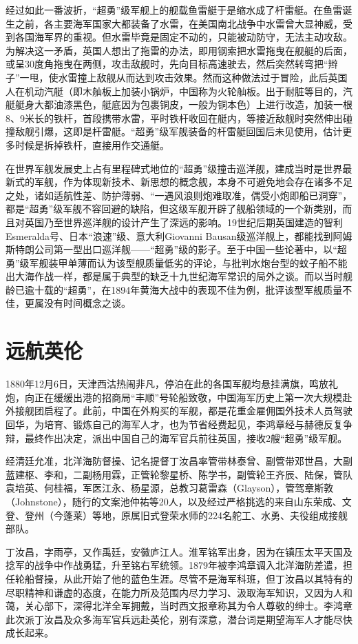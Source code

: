 \documentclass[12pt,UTF8]{ctexbook}
\begin{document}
经过如此一番波折，“超勇”级军舰上的舰载鱼雷艇于是缩水成了杆雷艇。在鱼雷诞生之前，各主要海军国家大都装备了水雷，在美国南北战争中水雷曾大显神威，受到各国海军界的重视。但水雷毕竟是固定不动的，只能被动防守，无法主动攻敌。为解决这一矛盾，英国人想出了拖雷的办法，即用钢索把水雷拖曳在舰艇的后面，或呈30度角拖曳在两侧，攻击敌舰时，先向目标高速驶去，然后突然转弯把“辫子”一甩，使水雷撞上敌舰从而达到攻击效果。然而这种做法过于冒险，此后英国人在机动汽艇（即木舢板上加装小锅炉，中国称为火轮舢板。出于耐脏等目的，汽艇艇身大都油漆黑色，艇底因为包裹铜皮，一般为铜本色）上进行改造，加装一根8、9米长的铁杆，首段携带水雷，平时铁杆收回在艇内，等接近敌舰时突然伸出碰撞敌舰引爆，这即是杆雷艇。“超勇”级军舰装备的杆雷艇回国后未见使用，估计更多时候是拆掉铁杆，直接用作交通艇。

在世界军舰发展史上占有里程碑式地位的“超勇”级撞击巡洋舰，建成当时是世界最新式的军舰，作为体现新技术、新思想的概念舰，本身不可避免地会存在诸多不足之处，诸如适航性差、防护薄弱、“一遇风浪则炮难取准，偶受小炮即船已洞穿”，都是“超勇”级军舰不容回避的缺陷，但这级军舰开辟了舰船领域的一个新类别，而且对英国乃至世界巡洋舰的设计产生了深远的影响。19世纪后期英国建造的智利Esmeralda号、日本“浪速”级、意大利Giovanni Bausan级巡洋舰上，都能找到阿姆斯特朗公司第一型出口巡洋舰——“超勇”级的影子。至于中国一些论著中，以“超勇”级军舰装甲单薄而认为该型舰质量低劣的评论，与批判水炮台型的蚊子船不能出大海作战一样，都是属于典型的缺乏十九世纪海军常识的局外之谈。而以当时舰龄已逾十载的“超勇”，在1894年黄海大战中的表现不佳为例，批评该型军舰质量不佳，更属没有时间概念之谈。

\section{远航英伦}

1880年12月6日，天津西沽热闹非凡，停泊在此的各国军舰均悬挂满旗，鸣放礼炮，向正在缓缓出港的招商局“丰顺”号轮船致敬，中国海军历史上第一次大规模赴外接舰团启程了。此前，中国在外购买的军舰，都是花重金雇佣国外技术人员驾驶回华，为培育、锻炼自己的海军人才，也为节省经费起见，李鸿章经与赫德反复争辩，最终作出决定，派出中国自己的海军官兵前往英国，接收2艘“超勇”级军舰。

经清廷允准，北洋海防督操、记名提督丁汝昌率管带林泰曾、副管带邓世昌，大副蓝建枢、李和，二副杨用霖，正管轮黎星桥、陈学书，副管轮王齐辰、陆保，管队袁培英、何桂福，军医江永、杨星源，总教习葛雷森（Glayson），管驾章斯敦（Johnstone），随行的文案池仲祐等20人，以及经过严格挑选的来自山东荣成、文登、登州（今蓬莱）等地，原属旧式登荣水师的224名舵工、水勇、夫役组成接舰部队。

丁汝昌，字雨亭，又作禹廷，安徽庐江人。淮军铭军出身，因为在镇压太平天国及捻军的战争中作战勇猛，升至铭右军统领。1879年被李鸿章调入北洋海防差遣，担任轮船督操，从此开始了他的蓝色生涯。尽管不是海军科班，但丁汝昌以其特有的尽职精神和谦虚的态度，在能力所及范围内尽力学习、汲取海军知识，又因为人和蔼，关心部下，深得北洋全军拥戴，当时西文报章称其为令人尊敬的绅士。李鸿章此次派丁汝昌及众多海军官兵远赴英伦，别有深意，潜台词是期望海军人才能尽快成长起来。
\end{document}
